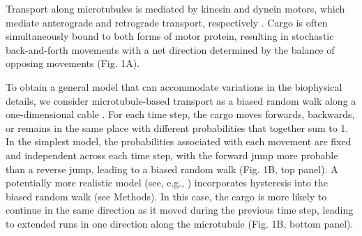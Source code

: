 \documentclass[11pt]{wlpeerj}
\begin{document}
Transport along microtubules is mediated by kinesin and dynein motors, which mediate anterograde and retrograde transport, respectively \citep{Hirokawa_2010,Gagnon_2011}.
Cargo is often simultaneously bound to both forms of motor protein, resulting in stochastic back-and-forth movements with a net direction determined by the balance of opposing movements \citep{Hancock_2014,Buxbaum_2014b} (Fig. 1A).

To obtain a general model that can accommodate variations in the biophysical details, we consider microtubule-based transport as a biased random walk along a one-dimensional cable \citep{Bressloff_2006,Bressloff_2009,Newby_2010}.
For each time step, the cargo moves forwards, backwards, or remains in the same place with different probabilities that together sum to 1.
In the simplest model, the probabilities associated with each movement are fixed and independent across each time step, with the forward jump more probable than a reverse jump, leading to a biased random walk (Fig. 1B, top panel).
A potentially more realistic model (see, e.g., \cite{Soundararajan_2014}) incorporates hysteresis into the biased random walk (see Methods). In this case, the cargo is more likely to continue in the same direction as it moved during the previous time step, leading to extended runs in one direction along the microtubule (Fig. 1B, bottom panel).
\end{document}
